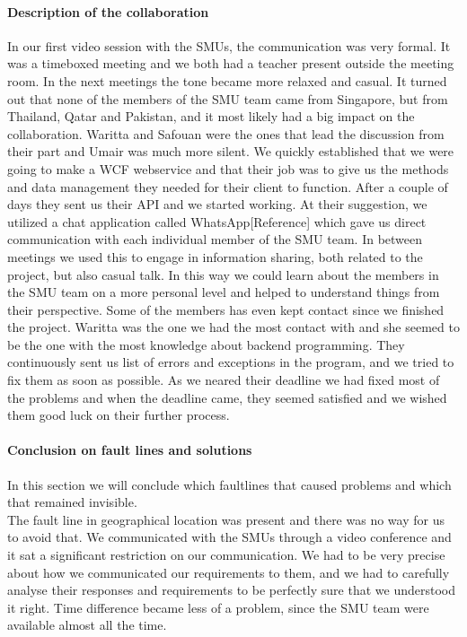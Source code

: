 \documentclass[a4paper,11pt,report]{article}
\begin{document}
\paragraph{Description of the collaboration }
In our first video session with the SMUs, the communication was very formal. It was a timeboxed meeting and we both had a teacher present outside the meeting room. In the next meetings the tone became more relaxed and casual. It turned out that none of the members of the SMU team came from Singapore, but from Thailand, Qatar and Pakistan, and it most likely had a big impact on the collaboration. Waritta and Safouan were the ones that lead the discussion from their part and Umair was much more silent. We quickly established that we were going to make a WCF webservice and that their job was to give us the methods and data management they needed for their client to function. After a couple of days they sent us their API and we started working. At their suggestion, we utilized a chat application called WhatsApp[Reference] which gave us direct communication with each individual member of the SMU team. In between meetings we used this to engage in information sharing, both related to the project, but also casual talk. In this way we could learn about the members in the SMU team on a more personal level and helped to understand things from their perspective. Some of the members has even kept contact since we finished the project. Waritta was the one we had the most contact with and she seemed to be the one with the most knowledge about backend programming. They continuously sent us list of errors and exceptions in the program, and we tried to fix them as soon as possible. As we neared their deadline we had fixed most of the problems and when the deadline came, they seemed satisfied and we wished them good luck on their further process. \\

\paragraph{Conclusion on fault lines and solutions}
In this section we will conclude which faultlines that caused problems and which that remained invisible. \\

The fault line in geographical location was present and there was no way for us to avoid that. We communicated with the SMUs through a video conference and it sat a significant restriction on our communication. We had to be very precise about how we communicated our requirements to them, and we had to carefully analyse their responses and requirements to be perfectly sure that we understood it right. Time difference became less of a problem, since the SMU team were available almost all the time. \\
\end{document}
